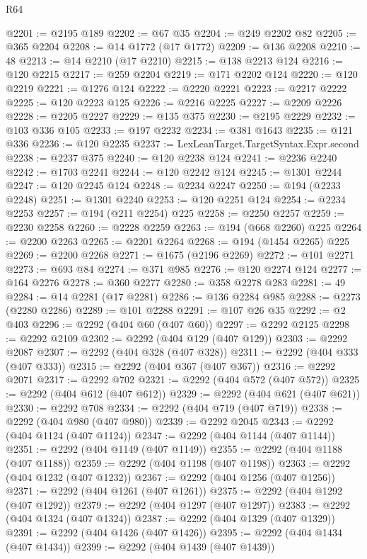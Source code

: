 \begin{lexlean}{R64}
\begin{coremodule}
@2201 := @2195 @189
@2202 := @67 @35
@2204 := @249 @2202 @82
@2205 := @365 @2204
@2208 := @14 @1772 (@17 @1772)
@2209 := @136 @2208
@2210 := 48
@2213 := @14 @2210 (@17 @2210)
@2215 := @138 @2213 @124
@2216 := @120 @2215
@2217 := @259 @2204
@2219 := @171 @2202 @124
@2220 := @120 @2219
@2221 := @1276 @124
@2222 := @2220 @2221
@2223 := @2217 @2222
@2225 := @120 @2223 @125
@2226 := @2216 @2225
@2227 := @2209 @2226
@2228 := @2205 @2227
@2229 := @135 @375
@2230 := @2195 @2229
@2232 := @103 @336 @105
@2233 := @197 @2232
@2234 := @381 @1643
@2235 := @121 @336
@2236 := @120 @2235
@2237 := LexLeanTarget.TargetSyntax.Expr.second
@2238 := @2237 @375
@2240 := @120 @2238 @124
@2241 := @2236 @2240
@2242 := @1703 @2241
@2244 := @120 @2242 @124
@2245 := @1301 @2244
@2247 := @120 @2245 @124
@2248 := @2234 @2247
@2250 := @194 (@2233 @2248)
@2251 := @1301 @2240
@2253 := @120 @2251 @124
@2254 := @2234 @2253
@2257 := @194 (@211 @2254) @225
@2258 := @2250 @2257
@2259 := @2230 @2258
@2260 := @2228 @2259
@2263 := @194 (@668 @2260) @225
@2264 := @2200 @2263
@2265 := @2201 @2264
@2268 := @194 (@1454 @2265) @225
@2269 := @2200 @2268
@2271 := @1675 (@2196 @2269)
@2272 := @101 @2271
@2273 := @693 @84
@2274 := @371 @985
@2276 := @120 @2274 @124
@2277 := @164 @2276
@2278 := @360 @2277
@2280 := @358 @2278 @283
@2281 := 49
@2284 := @14 @2281 (@17 @2281)
@2286 := @136 @2284 @985
@2288 := @2273 (@2280 @2286)
@2289 := @101 @2288
@2291 := @107 @26 @35
@2292 := @2 @403
@2296 := @2292 (@404 @60 (@407 @60))
@2297 := @2292 @2125
@2298 := @2292 @2109
@2302 := @2292 (@404 @129 (@407 @129))
@2303 := @2292 @2087
@2307 := @2292 (@404 @328 (@407 @328))
@2311 := @2292 (@404 @333 (@407 @333))
@2315 := @2292 (@404 @367 (@407 @367))
@2316 := @2292 @2071
@2317 := @2292 @702
@2321 := @2292 (@404 @572 (@407 @572))
@2325 := @2292 (@404 @612 (@407 @612))
@2329 := @2292 (@404 @621 (@407 @621))
@2330 := @2292 @708
@2334 := @2292 (@404 @719 (@407 @719))
@2338 := @2292 (@404 @980 (@407 @980))
@2339 := @2292 @2045
@2343 := @2292 (@404 @1124 (@407 @1124))
@2347 := @2292 (@404 @1144 (@407 @1144))
@2351 := @2292 (@404 @1149 (@407 @1149))
@2355 := @2292 (@404 @1188 (@407 @1188))
@2359 := @2292 (@404 @1198 (@407 @1198))
@2363 := @2292 (@404 @1232 (@407 @1232))
@2367 := @2292 (@404 @1256 (@407 @1256))
@2371 := @2292 (@404 @1261 (@407 @1261))
@2375 := @2292 (@404 @1292 (@407 @1292))
@2379 := @2292 (@404 @1297 (@407 @1297))
@2383 := @2292 (@404 @1324 (@407 @1324))
@2387 := @2292 (@404 @1329 (@407 @1329))
@2391 := @2292 (@404 @1426 (@407 @1426))
@2395 := @2292 (@404 @1434 (@407 @1434))
@2399 := @2292 (@404 @1439 (@407 @1439))

\end{coremodule}
\end{lexlean}
